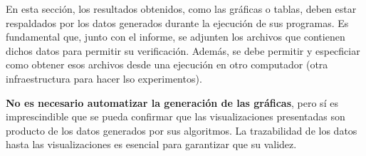 En esta sección, los resultados obtenidos, como las gráficas o tablas, deben estar respaldados por los datos generados durante la ejecución de sus programas. Es fundamental que, junto con el informe, se adjunten los archivos que contienen dichos datos para permitir su verificación. Además, se debe permitir y especficiar como obtener esos archivos desde una ejecución en otro computador (otra infraestructura para hacer lso experimentos).

\textbf{No es necesario automatizar la generación de las gráficas}, pero sí es imprescindible que se pueda confirmar que las visualizaciones presentadas son producto de los datos generados por sus algoritmos. La trazabilidad de los datos hasta las visualizaciones es esencial para garantizar que su validez.
